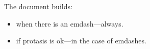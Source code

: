 \documentclass{article}
\begin{document}
The document builds:
\begin{itemize}
	\item when there is an emdash---always.
	\item if protasis is ok---in the case of emdashes.
\end{itemize}
\end{document}
